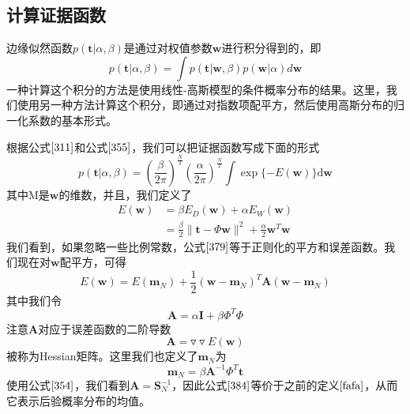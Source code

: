 \subsection*{计算证据函数}
边缘似然函数$p(\boldsymbol{t}|\alpha,\beta)$是通过对权值参数$\boldsymbol{w}$进行积分得到的，即
\begin{equation}
	p(\boldsymbol{t}|\alpha,\beta)=\int p(\boldsymbol{t}|\boldsymbol{w},\beta)p(\boldsymbol{w}|\alpha)d\boldsymbol{w}
\end{equation}
一种计算这个积分的方法是使用线性-高斯模型的条件概率分布的结果。这里，我们使用另一种方法计算这个积分，即通过对指数项配平方，然后使用高斯分布的归一化系数的基本形式。

根据公式$\ref{311}$和公式$\ref{355}$，我们可以把证据函数写成下面的形式
\begin{equation}
\label{378}
	p(\boldsymbol{t}|\alpha,\beta)=\left(\frac{\beta}{2\pi} \right)^{\frac{N}{2}}\left(\frac{\alpha}{2\pi} \right)^{\frac{N}{2}}\int \exp\{-E(\boldsymbol{w})\}\mathrm{d}\boldsymbol{w}
\end{equation}
其中M是$\boldsymbol{w}$的维数，并且，我们定义了
\begin{equation}
\label{379}
	\begin{aligned}
		E(\boldsymbol{w})&=\beta E_D(\boldsymbol{w})+\alpha E_W(\boldsymbol{w})\\
		&=\frac{\beta}{2}\lVert \boldsymbol{t}-\Phi\boldsymbol{w}\rVert^2 +\frac{\alpha}{2}\boldsymbol{w}^T\boldsymbol{w}
	\end{aligned}
\end{equation}
我们看到，如果忽略一些比例常数，公式$\ref{379}$等于正则化的平方和误差函数。我们现在对$\boldsymbol{w}$配平方，可得
\begin{equation}
	E(\boldsymbol{w})=E(\boldsymbol{m}_N)+\frac{1}{2}(\boldsymbol{w}-\boldsymbol{m}_N)^T\boldsymbol{A}(\boldsymbol{w}-\boldsymbol{m}_N)
\end{equation}
其中我们令
\begin{equation}
	\boldsymbol{A}=\alpha \boldsymbol{I}+\beta \Phi^T\Phi
\end{equation}
注意$\boldsymbol{A}$对应于误差函数的二阶导数
\begin{equation}
	\boldsymbol{A}=\triangledown\triangledown E(\boldsymbol{w})
\end{equation}
被称为Hessian矩阵。这里我们也定义了$\boldsymbol{m}_N$为
\begin{equation}
\label{384}
	\boldsymbol{m}_N=\beta\boldsymbol{A}^{-1}\Phi^T\boldsymbol{t}
\end{equation}
使用公式$\ref{354}$，我们看到$\boldsymbol{A}=\boldsymbol{S}_N^{-1}$，因此公式$\ref{384}$等价于之前的定义$\ref{fafa}$，从而它表示后验概率分布的均值。

